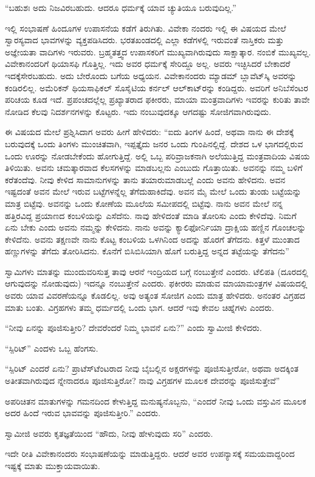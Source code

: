 “ಬಹುಶಃ ಅದು ನಿಜವಿರಬಹುದು. ಆದರೂ ಧರ್ಮಕ್ಕೆ ಯಾವ ಚ್ಯುತಿಯೂ ಬರುವುದಿಲ್ಲ.”

ಇಲ್ಲಿ ಸಂಭಾಷಣೆ ಹಿಂದೂಗಳ ಉಪಾಸನೆಯ ಕಡೆಗೆ ತಿರುಗಿತು. ವಿವೇಕಾ ನಂದರು ಇಲ್ಲಿ ಈ ವಿಷಯದ ಮೇಲೆ ಸ್ವಾರಸ್ಯವಾದ ಭಾವಗಳನ್ನು ವ್ಯಕ್ತಪಡಿಸಿದರು. ಭರತಖಂಡದಲ್ಲಿ ಎಲ್ಲಾ ಕಡೆಗಳಲ್ಲಿ ಇರುವಂತೆ ನಾಸ್ತಿಕರು ಮತ್ತು ಅಜ್ಞೇಯತಾ ವಾದಿಗಳು ಇರುವರು. ಬ್ರಹ್ಮತತ್ತ್ವದ ಉಪಾಸಕರಿಗೆ ಮುಖ್ಯವಾಗಿರುವುದು ಸಾಕ್ಷಾತ್ಕಾರ. ನಂಬಿಕೆ ಮುಖ್ಯವಲ್ಲ. ವಿವೇಕಾನಂದರಿಗೆ ಥಿಯಾಸಫಿ ಗೊತ್ತಿಲ್ಲ. ಇದು ಅವರ ಧರ್ಮಕ್ಕೆ ಸೇರಿದ್ದೂ ಅಲ್ಲ. ಅವರು ಇಚ್ಛಿಸಿದರೆ ಬೇಕಾದರೆ ಇದಕ್ಕೆಸೇರಬಹುದು. ಅದು ಬೇರೊಂದು ಬಗೆಯ ಅಧ್ಯಯನ. ವಿವೇಕಾನಂದರು ಮ್ಯಾಡಮ್​ ಬ್ಲಾವೆಟ್​ಸ್ಕಿ ಅವರನ್ನು ಕಂಡಿರಲಿಲ್ಲ. ಅಮೆರಿಕನ್​ ಥಿಯಸಾಫಿಕಲ್​ ಸೊಸೈಟಿಯ ಕರ್ನಲ್​ ಆಲ್​ಕಾಟ್​ರನ್ನು ಕಂಡಿದ್ದರು. ಅವರಿಗೆ ಅನಿಬೆಸೆಂಟರ ಪರಿಚಯ ಕೂಡ ಇದೆ. ಪ್ರಪಂಚದಲ್ಲೆಲ್ಲ ಪ್ರಖ್ಯಾತರಾದ ಫಕೀರರು, ಮಾಯಾ ಮಂತ್ರವಾದಿಗಳು ಇವರನ್ನು ಕುರಿತು ತಾವೇ ನೋಡಿದ ಕೆಲವು ನಿದರ್ಶನಗಳನ್ನು ಕೊಟ್ಟರು. ಇದು ನಂಬುವುದಕ್ಕೂ ಆಗದಷ್ಟು ಸೋಜಿಗವಾಗಿರುವುದು.

ಈ ವಿಷಯದ ಮೇಲೆ ಪ್ರಶ್ನಿಸಿದಾಗ ಅವರು ಹೀಗೆ ಹೇಳಿದರು: “ಐದು ತಿಂಗಳ ಹಿಂದೆ, ಅಥವಾ ನಾನು ಈ ದೇಶಕ್ಕೆ ಬರುವುದಕ್ಕೆ ಒಂದು ತಿಂಗಳು ಮುಂಚಿತವಾಗಿ, ಇಪ್ಪತ್ತೈದು ಜನರ ಒಂದು ಗುಂಪಿನಲ್ಲಿದ್ದೆ. ದೇಶದ ಒಳ ಭಾಗದಲ್ಲಿರುವ ಒಂದು ಊರನ್ನು ನೋಡಬೇಕೆಂದು ಹೋಗುತ್ತಿದ್ದೆ. ಅಲ್ಲಿ ಒಬ್ಬ ಪರಿವ್ರಾಜಕನಾಗಿ ಅಲೆಯುತ್ತಿದ್ದ ಮಂತ್ರವಾದಿಯ ವಿಷಯ ತಿಳಿಯಿತು. ಅವನು ಚಮತ್ಕಾರವಾದ ಕೆಲಸಗಳನ್ನು ಮಾಡಬಲ್ಲನು ಎಂಬುದು ಗೊತ್ತಾಯಿತು. ಅವನನ್ನು ನಮ್ಮ ಬಳಿಗೆ ಕರೆತಂದೆವು. ನೀವು ಕೇಳಿದ ಸಾಮಾನುಗಳನ್ನು ತಾನು ತಯಾರುಮಾಡಬಲ್ಲೆ ಎಂದು ಅವನು ಹೇಳಿದನು. ಅವನ ಇಷ್ಟದಂತೆ ಅವನ ಮೇಲೆ ಇರುವ ಬಟ್ಟೆಗಳನ್ನೆಲ್ಲ ತೆಗೆದುಹಾಕಿದೆವು. ಅವನ ಮೈ ಮೇಲೆ ಒಂದು ತುಂಡು ಬಟ್ಟೆಯನ್ನು ಮಾತ್ರ ಬಿಟ್ಟೆವು. ಅವನನ್ನು ಒಂದು ಕೋಣೆಯ ಮೂಲೆಯ ಸಮೀಪದಲ್ಲಿ ಬಿಟ್ಟೆವು. ನಾನು ಅವನ ಮೇಲೆ ನನ್ನ ಹತ್ತಿರವಿದ್ದ ಪ್ರಯಾಣದ ಕಂಬಳಿಯನ್ನು ಎಸೆದೆನು. ನಾವು ಹೇಳಿದಂತೆ ಮಾಡಿ ತೋರಿಸು ಎಂದು ಕೇಳಿದೆವು. ನಿಮಗೆ ಏನು ಬೇಕು ಎಂದು ಅವನು ನಮ್ಮನ್ನು ಕೇಳಿದನು. ನಾನು ಅವನ್ನು ಕ್ಯಾಲಿಫೋರ್ನಿಯಾ ದ್ರಾಕ್ಷಿಯ ಹಣ್ಣಿನ ಗೊಂಚಲನ್ನು ಕೇಳಿದೆನು. ಅವನು ತಕ್ಷಣವೇ ನಾನು ಕೊಟ್ಟ ಕಂಬಳಿಯ ಒಳಗಿನಿಂದ ಅದನ್ನು ಹೊರಗೆ ತೆಗೆದನು. ಕಿತ್ತಳೆ ಮುಂತಾದ ಹಣ್ಣುಗಳನ್ನು ತೆಗೆದು ತೋರಿಸಿದನು. ಕೊನೆಗೆ ಬಿಸಿಬಿಸಿಯಾಗಿ ಹೊಗೆ ಬರುತ್ತಿದ್ದ ಅನ್ನದ ತಟ್ಟೆಯನ್ನು ತೆಗೆದನು”

ಸ್ವಾಮಿಗಳು ಮಾತನ್ನು ಮುಂದುವರಿಸುತ್ತ ತಾವು ಆರನೆ ಇಂದ್ರಿಯದ ಬಗ್ಗೆ ನಂಬುತ್ತೇನೆ ಎಂದರು. ಟೆಲಿಪತಿ (ದೂರದಲ್ಲಿ ಆಗುವುದನ್ನು ನೋಡುವುದು) ಇದನ್ನೂ ನಂಬುತ್ತೇನೆ ಎಂದರು. ಫಕೀರರು ಮಾಡುವ ಮಾಯಾಮಂತ್ರಗಳ ವಿಷಯದಲ್ಲಿ ಅವರು ಯಾವ ವಿವರಣೆಯನ್ನೂ ಕೊಡಲಿಲ್ಲ. ಅವು ಅತ್ಯಂತ ಸೋಜಿಗ ಎಂದು ಮಾತ್ರ ಹೇಳಿದರು. ಅನಂತರ ವಿಗ್ರಹದ ಮಾತು ಬಂತು. ವಿಗ್ರಹಗಳು ತಮ್ಮ ಧರ್ಮದಲ್ಲಿ ಒಂದು ಭಾಗ. ಆದರೆ ಇವು ಕೇವಲ ಚಿಹ್ನೆಗಳು ಎಂದರು.

“ನೀವು ಏನನ್ನು ಪೂಜಿಸುತ್ತೀರಿ? ದೇವರೆಂದರೆ ನಿಮ್ಮ ಭಾವನೆ ಏನು?” ಎಂದು ಸ್ವಾಮೀಜಿ ಕೇಳಿದರು.

“ಸ್ಪಿರಿಟ್​” ಎಂದಳು ಒಬ್ಬ ಹೆಂಗಸು.

“ಸ್ಪಿರಿಟ್​ ಎಂದರೆ ಏನು? ಪ್ರಾಟೆಸ್​ಟೆಂಟರಾದ ನೀವು ಬೈಬಲ್ಲಿನ ಅಕ್ಷರಗಳನ್ನು ಪೂಜಿಸುತ್ತೀರೋ, ಅಥವಾ ಅದಕ್ಕಿಂತ ಅತೀತವಾಗಿರುವುದ ನ್ನೇನಾದರೂ ಪೂಜಿಸುತ್ತಿರೋ? ನಾವು ವಿಗ್ರಹಗಳ ಮೂಲಕ ದೇವರನ್ನು ಪೂಜಿಸುತ್ತೇವೆ”

ಅಪರಿಚಿತನ ಮಾತುಗಳನ್ನು ಗಮನದಿಂದ ಕೇಳುತ್ತಿದ್ದ ಮನುಷ್ಯನೊಬ್ಬನು, “ಎಂದರೆ ನೀವು ಒಂದು ವಸ್ತುವಿನ ಮೂಲಕ ಅದರ ಹಿಂದೆ ಇರುವ ಭಾವವನ್ನು ಪೂಜಿಸುತ್ತೀರಿ.” ಎಂದರು.

ಸ್ವಾಮೀಜಿ ಅವರು ಕೃತಜ್ಞತೆಯಿಂದ “ಹೌದು, ನೀವು ಹೇಳುವುದು ಸರಿ” ಎಂದರು.

ಇದೇ ರೀತಿ ವಿವೇಕಾನಂದರು ಸಂಭಾಷಣೆಯನ್ನು ಮಾಡುತ್ತಿದ್ದರು. ಆದರೆ ಅವರ ಉಪನ್ಯಾಸಕ್ಕೆ ಸಮಯವಾದ್ದರಿಂದ ಇಷ್ಟಕ್ಕೆ ಮಾತು ಮುಕ್ತಾಯವಾಯಿತು.

